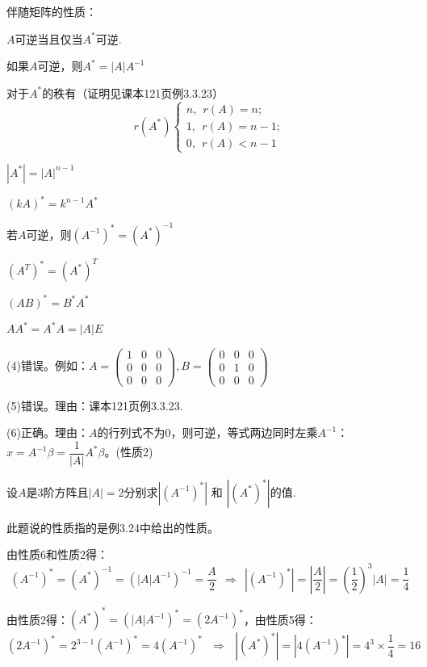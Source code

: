 \documentclass[a4paper]{report}
\begin{document}
\begin{tips}
伴随矩阵的性质：

\begin{asparaenum}[(1)]
\item $A$可逆当且仅当$A^*$可逆.
\item 如果$A$可逆，则$A^*=|A|A^{-1}$
\item 对于$A^*$的秩有（证明见课本121页例3.3.23）
\begin{equation*}
r(A^*)
  \begin{cases}
    n,~~r(A)=n;\\
    1,~~r(A)=n-1;\\
    0,~~r(A)<n-1
  \end{cases}
\end{equation*}
\item $|A^*|=|A|^{n-1}$
\item $(kA)^*=k^{n-1}A^*$
\item 若$A$可逆，则$(A^{-1})^*=(A^*)^{-1}$
\item $(A^T)^*=(A^*)^T$
\item $(AB)^*=B^*A^*$
\item $AA^*=A^*A=|A|E$
\end{asparaenum}
\hphantom{.}
\end{tips}

\begin{jie}
(4)错误。例如：$A=
\begin{pmatrix}
1&0&0\\
0&0&0\\
0&0&0
\end{pmatrix},B=\begin{pmatrix}
0&0&0\\
0&1&0\\
0&0&0
\end{pmatrix}
$

(5)错误。理由：课本121页例3.3.23.

(6)正确。理由：$A$的行列式不为0，则可逆，等式两边同时左乘$A^{-1}$：$x=A^{-1}\beta=\dfrac{1}{|A|}A^*\beta$。(性质2)
\end{jie}

\EX 设$A$是$3$阶方阵且$|A|=2$分别求$|(A^{-1})^*|$ 和
$|(A^*)^*|$的值.

\begin{jie}
此题说的性质指的是例3.24中给出的性质。

由性质6和性质2得：
\begin{equation*}
(A^{-1})^*=(A^*)^{-1}=(|A|A^{-1})^{-1}=\frac{A}{2}~~\Rightarrow~~|(A^{-1})^*|=\left|\frac{A}{2}\right|=\left(\frac{1}{2}\right)^3|A|=\frac{1}{4}
\end{equation*}

由性质2得：$(A^*)^*=(|A|A^{-1})^*=(2A^{-1})^*$，由性质5得：
\begin{equation*}
  (2A^{-1})^*=2^{3-1}(A^{-1})^*=4(A^{-1})^*~~~\Rightarrow~~~|(A^*)^*|=|4(A^{-1})^*|=4^3\times\frac{1}{4}=16
\end{equation*}
\end{jie}
\end{document}
